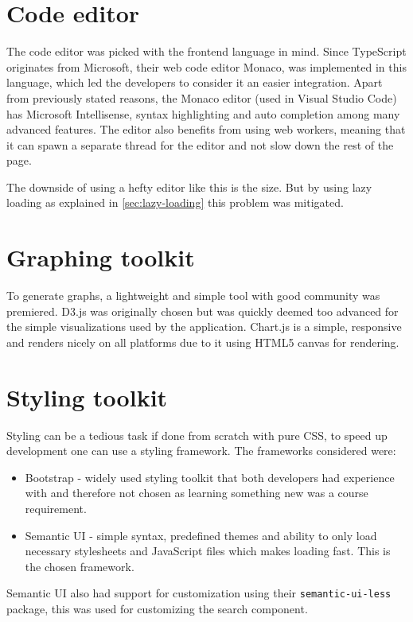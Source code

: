 \documentclass[12pt,a4paper]{report}
\begin{document}
\section{Code editor}
The code editor was picked with the frontend language in mind. Since TypeScript originates from Microsoft, their web code editor Monaco, was implemented in this language, which led the developers to consider it an easier integration.
Apart from previously stated reasons, the Monaco editor (used in Visual Studio Code) has Microsoft Intellisense, syntax highlighting and auto completion among many advanced features.
The editor also benefits from using web workers, meaning that it can spawn a separate thread for the editor and not slow down the rest of the page.

The downside of using a hefty editor like this is the size. But by using lazy loading as explained in \autoref{sec:lazy-loading} this problem was mitigated.

\section{Graphing toolkit}
To generate graphs, a lightweight and simple tool with good community was premiered. D3.js was originally chosen but was quickly deemed too advanced for the simple visualizations used by the application. Chart.js is a simple, responsive and renders nicely on all platforms due to it using HTML5 canvas for rendering.

\section{Styling toolkit}
Styling can be a tedious task if done from scratch with pure CSS, to speed up development one can use a styling framework.
The frameworks considered were:

\begin{itemize}
    \item Bootstrap - widely used styling toolkit that both developers had experience with and therefore not chosen as learning something new was a course requirement.
    \item Semantic UI - simple syntax, predefined themes and ability to only load necessary stylesheets and JavaScript files which makes loading fast. This is the chosen framework.
\end{itemize}

Semantic UI also had support for customization using their \texttt{semantic-ui-less} package, this was used for customizing the search component.
\end{document}
